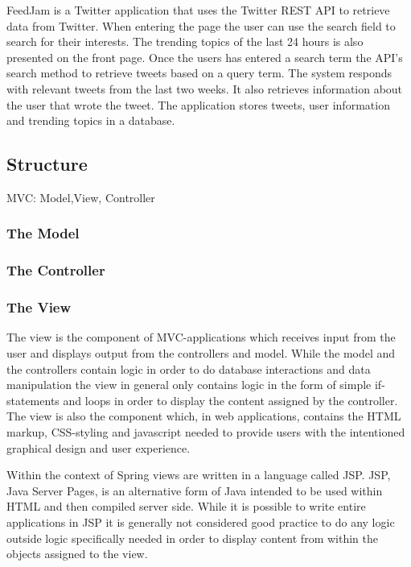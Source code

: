 FeedJam is a Twitter application that uses the Twitter REST API to retrieve data from Twitter. When entering the page the user can use the search field to search for their interests. The trending topics of the last 24 hours is also presented on the front page. Once the users has entered a search term the API's search method to retrieve tweets based on a query term. 
The system responds with relevant tweets from the last two weeks. It also retrieves information about the user that wrote the tweet. The application stores tweets, user information and trending topics in a database. 

\subsection{Structure}
MVC: Model,View, Controller

\subsubsection{The Model}

\subsubsection{The Controller}

\subsubsection{The View}
The view is the component of MVC-applications which receives input from the user and displays output from the controllers and model. While the model and the controllers contain logic in order to do database interactions and data manipulation the view in general only contains logic in the form of simple if-statements and loops in order to display the content assigned by the controller. The view is also the component which, in web applications, contains the HTML markup, CSS-styling and javascript needed to provide users with the intentioned graphical design and user experience.

Within the context of Spring views are written in a language called JSP. JSP, Java Server Pages, is an alternative form of Java intended to be used within HTML and then compiled server side. While it is possible to write entire applications in JSP it is generally not considered good practice to do any logic outside logic specifically needed in order to display content from within the objects assigned to the view.

